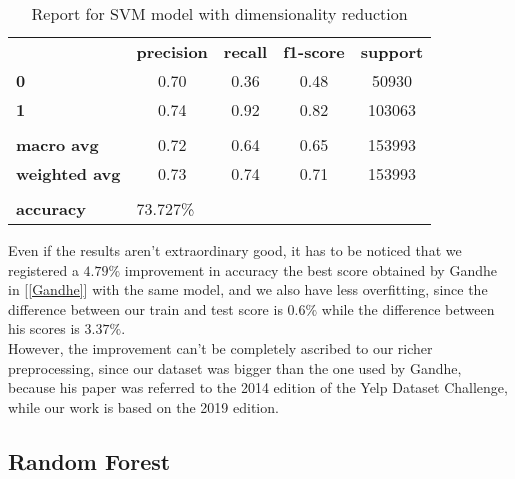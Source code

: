 \begin{table}[h!]
    \centering
    \begin{tabular}{lcccc}
        \rowcolor[HTML]{EEEEEE} 
        \cellcolor[HTML]{FBFBFB} & \textbf{precision} & \textbf{recall} & \textbf{f1-score} & \textbf{support} \\
        \rowcolor[HTML]{EEEEEE} 
        \textbf{0}               & 0.70               & 0.36            & 0.48              & 50930            \\
        \rowcolor[HTML]{EEEEEE} 
        \textbf{1}               & 0.74               & 0.92            & 0.82              & 103063           \\
        \rowcolor[HTML]{FBFBFB} 
        &                    &                 &                   &                  \\
        \rowcolor[HTML]{EEEEEE} 
        \textbf{macro avg}       & 0.72               & 0.64            & 0.65              & 153993           \\
        \rowcolor[HTML]{EEEEEE} 
        \textbf{weighted avg}    & 0.73               & 0.74            & 0.71              & 153993           \\
        \rowcolor[HTML]{FBFBFB} 
        &                    &                 &                   &                  \\
        \rowcolor[HTML]{EEEEEE} 
        \textbf{accuracy}        & \multicolumn{4}{l}{\cellcolor[HTML]{EEEEEE}73.727\%}                         
    \end{tabular}
    \caption{Report for SVM model with dimensionality reduction}
    \label{tab:svm-res-1}
\end{table}

Even if the results aren't extraordinary good, it has to be noticed that we registered a $4.79‬\%$ improvement in accuracy \wrt the best score obtained by Gandhe in [\ref{Gandhe}] with the same model, and we also have less overfitting, since the difference between our train and test score is $0.6\%$ while the difference between his scores is $3.37\%$.\\
However, the improvement can't be completely ascribed to our richer preprocessing, since our dataset was bigger than the one used by Gandhe, because his paper was referred to the 2014 edition of the Yelp Dataset Challenge, while our work is based on the 2019 edition.


\newpage
\subsection{Random Forest}\label{sec:rf}

